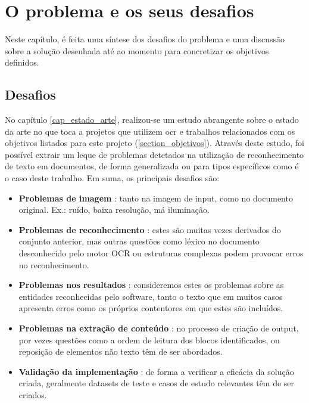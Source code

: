 \chapter{O problema e os seus desafios}
\label{cap_problema}


Neste capítulo, é feita uma síntese dos desafios do problema e uma discussão sobre a solução desenhada até ao momento para concretizar os objetivos definidos.

\section{Desafios}

No capítulo \ref{cap_estado_arte}, realizou-se um estudo abrangente sobre o estado da arte no que toca a projetos que utilizem \acrshort{ocr} e trabalhos relacionados com os objetivos listados para este projeto (\ref{section_objetivos}).  Através deste estudo, foi possível extrair um leque de problemas detetados na utilização de reconhecimento de texto em documentos, de forma generalizada ou para tipos específicos como é o caso deste trabalho. Em suma, os principais desafios são:
\begin{itemize}
    \item \textbf{Problemas de imagem} : tanto na imagem de input, como no documento original. Ex.: ruído, baixa resolução, má iluminação.
    \item \textbf{Problemas de reconhecimento} : estes são muitas vezes derivados do conjunto anterior, mas outras questões como léxico no documento desconhecido pelo motor OCR ou estruturas complexas podem provocar erros no reconhecimento.
    \item \textbf{Problemas nos resultados} : consideremos estes os problemas sobre as entidades reconhecidas pelo software, tanto o texto que em muitos casos apresenta erros como os próprios contentores em que estes são incluídos.
    \item \textbf{Problemas na extração de conteúdo} : no processo de criação de output, por vezes questões como a ordem de leitura dos blocos identificados, ou reposição de elementos não texto têm de ser abordados.
    \item \textbf{Validação da implementação} : de forma a verificar a eficácia da solução criada, geralmente datasets de teste e casos de estudo relevantes têm de ser criados.
\end{itemize}


